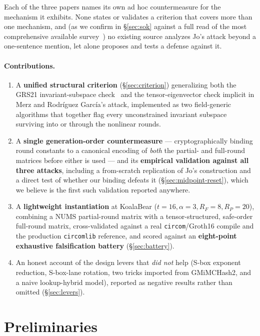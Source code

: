 \documentclass[11pt]{article}
\begin{document}
Each of the three papers names its own ad hoc countermeasure for the
mechanism it exhibits. None states or validates a criterion that covers
more than one mechanism, and (as we confirm in
\S\ref{sec:sok} against a full read of the most comprehensive available
survey~\cite{sok2026}) no existing source analyzes Jo's attack beyond a
one-sentence mention, let alone proposes and tests a defense against it.

\paragraph{Contributions.}
\begin{enumerate}[leftmargin=1.4em]
  \item A \textbf{unified structural criterion} (\S\ref{sec:criterion})
  generalizing both the GRS21 invariant-subspace
  check~\cite{grs21} and the tensor-eigenvector check implicit in
  Merz and Rodr\'iguez Garc\'ia's attack, implemented as two
  field-generic algorithms that together flag every unconstrained
  invariant subspace surviving into or through the nonlinear rounds.
  \item A \textbf{single generation-order countermeasure} ---
  cryptographically binding round constants to a canonical encoding of
  \emph{both} the partial- and full-round matrices before either is
  used --- and its \textbf{empirical validation against all three attacks},
  including a from-scratch replication of Jo's construction and a direct
  test of whether our binding defeats it (\S\ref{sec:midpoint-reset}),
  which we believe is the first such validation reported anywhere.
  \item A \textbf{lightweight instantiation} at KoalaBear
  ($t=16,\alpha=3,R_F=8,R_P=20$), combining a NUMS partial-round matrix
  with a tensor-structured, safe-order full-round matrix, cross-validated
  against a real \texttt{circom}/Groth16 compile and the production
  \texttt{circomlib} reference, and scored against an
  \textbf{eight-point exhaustive falsification battery}
  (\S\ref{sec:battery}).
  \item An honest account of the design levers that \emph{did not} help
  (S-box exponent reduction, S-box-lane rotation, two tricks imported from
  GMiMCHash2, and a naive lookup-hybrid model), reported as negative
  results rather than omitted (\S\ref{sec:levers}).
\end{enumerate}

\section{Preliminaries}
\end{document}
